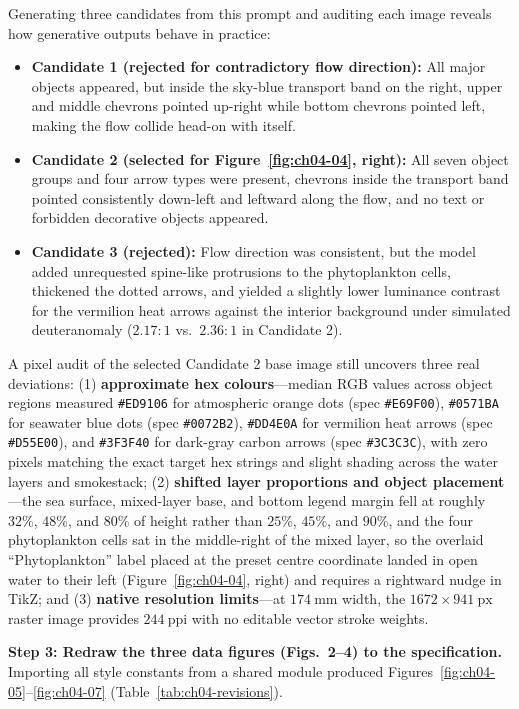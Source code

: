 Generating three candidates from this prompt and auditing each image reveals how generative outputs behave in practice:
\begin{itemize}
\item \textbf{Candidate 1 (rejected for contradictory flow direction):} All major objects appeared, but inside the sky-blue transport band on the right, upper and middle chevrons pointed up-right while bottom chevrons pointed left, making the flow collide head-on with itself.
\item \textbf{Candidate 2 (selected for Figure~\ref{fig:ch04-04}, right):} All seven object groups and four arrow types were present, chevrons inside the transport band pointed consistently down-left and leftward along the flow, and no text or forbidden decorative objects appeared.
\item \textbf{Candidate 3 (rejected):} Flow direction was consistent, but the model added unrequested spine-like protrusions to the phytoplankton cells, thickened the dotted arrows, and yielded a slightly lower luminance contrast for the vermilion heat arrows against the interior background under simulated deuteranomaly ($2.17:1$ vs.\ $2.36:1$ in Candidate 2).
\end{itemize}

A pixel audit of the selected Candidate 2 base image still uncovers three real deviations: (1) \textbf{approximate hex colours}---median RGB values across object regions measured \texttt{\#ED9106} for atmospheric orange dots (spec \texttt{\#E69F00}), \texttt{\#0571BA} for seawater blue dots (spec \texttt{\#0072B2}), \texttt{\#DD4E0A} for vermilion heat arrows (spec \texttt{\#D55E00}), and \texttt{\#3F3F40} for dark-gray carbon arrows (spec \texttt{\#3C3C3C}), with zero pixels matching the exact target hex strings and slight shading across the water layers and smokestack; (2) \textbf{shifted layer proportions and object placement}---the sea surface, mixed-layer base, and bottom legend margin fell at roughly $32\%$, $48\%$, and $80\%$ of height rather than $25\%$, $45\%$, and $90\%$, and the four phytoplankton cells sat in the middle-right of the mixed layer, so the overlaid ``Phytoplankton'' label placed at the preset centre coordinate landed in open water to their left (Figure~\ref{fig:ch04-04}, right) and requires a rightward nudge in TikZ; and (3) \textbf{native resolution limits}---at $174\ \text{mm}$ width, the $1672 \times 941\ \text{px}$ raster image provides $244\ \text{ppi}$ with no editable vector stroke weights.

\textbf{Step 3: Redraw the three data figures (Figs.\ 2--4) to the specification.} Importing all style constants from a shared module produced Figures~\ref{fig:ch04-05}--\ref{fig:ch04-07} (Table~\ref{tab:ch04-revisions}).

